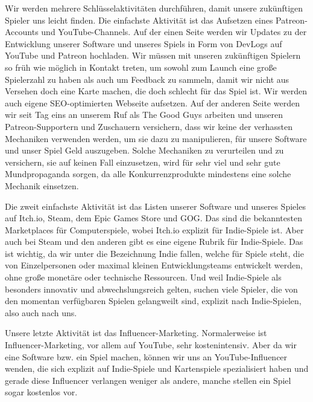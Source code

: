 \documentclass[fontsize=11, a4aper]{scrartcl}
\begin{document}
Wir werden mehrere Schlüsselaktivitäten durchführen, damit unsere zukünftigen Spieler uns leicht finden. Die einfachste Aktivität ist das Aufsetzen eines Patreon-Accounts und YouTube-Channels. Auf der einen Seite werden wir Updates zu der Entwicklung unserer Software und unseres Spiels in Form von DevLogs auf YouTube und Patreon hochladen. Wir müssen mit unseren zukünftigen Spielern so früh wie möglich in Kontakt treten, um sowohl zum Launch eine große Spielerzahl zu haben als auch um Feedback zu sammeln, damit wir nicht aus Versehen doch eine Karte machen, die doch schlecht für das Spiel ist. Wir werden auch eigene SEO-optimierten Webseite aufsetzen. Auf der anderen Seite werden wir seit Tag eins an unserem Ruf als \glqq The Good Guys\grqq{} arbeiten und unseren Patreon-Supportern und Zuschauern versichern, dass wir keine der verhassten Mechaniken verwenden werden, um sie dazu zu manipulieren, für unsere Software und unser Spiel Geld auszugeben. Solche Mechaniken zu verurteilen und zu versichern, sie auf keinen Fall einzusetzen, wird für sehr viel und sehr gute Mundpropaganda sorgen, da alle Konkurrenzprodukte mindestens eine solche Mechanik einsetzen.\hfill\newline

\noindent Die zweit einfachste Aktivität ist das Listen unserer Software und unseres Spieles auf Itch.io, Steam, dem Epic Games Store und GOG. Das sind die bekanntesten Marketplaces für Computerspiele, wobei Itch.io explizit für Indie-Spiele ist. Aber auch bei Steam und den anderen gibt es eine eigene Rubrik für Indie-Spiele. Das ist wichtig, da wir unter die Bezeichnung \glqq Indie\grqq{} fallen, welche für Spiele steht, die von Einzelpersonen oder maximal kleinen Entwicklungsteams entwickelt werden, ohne große monetäre oder technische Ressourcen. Und weil Indie-Spiele als besonders innovativ und abwechslungsreich gelten, suchen viele Spieler, die von den momentan verfügbaren Spielen gelangweilt sind, explizit nach Indie-Spielen, also auch nach uns.\hfill\newline

\noindent Unsere letzte Aktivität ist das Influencer-Marketing. Normalerweise ist Influencer-Marketing, vor allem auf YouTube, sehr kostenintensiv. Aber da wir eine Software bzw. ein Spiel machen, können wir uns an YouTube-Influencer wenden, die sich explizit auf Indie-Spiele und Kartenspiele spezialisiert haben und gerade diese Influencer verlangen weniger als andere, manche stellen ein Spiel sogar kostenlos vor.\hfill\newline
\end{document}

